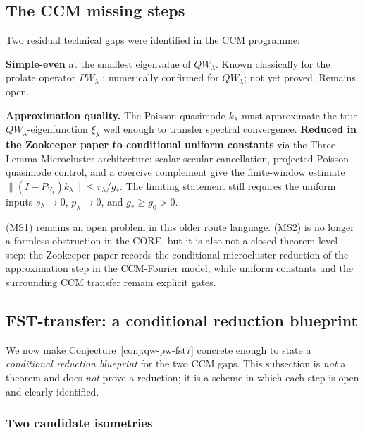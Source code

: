 \documentclass[11pt,a4paper]{article}
\theoremstyle{plain}
\theoremstyle{definition}
\begin{document}
\subsection{The CCM missing steps}
\label{sec:ccm-missing-steps}

Two residual technical gaps were identified in the CCM programme:
\begin{description}[leftmargin=*,style=nextline]
\item[(MS1)] \textbf{Simple-even} at the smallest eigenvalue of
  $QW_\lambda$.  Known classically for the prolate operator
  $PW_\lambda$ \cite{SlepianPollack1961}; numerically confirmed for
  $QW_\lambda$; not yet proved.  Remains open.
\item[(MS2)] \textbf{Approximation quality.} The Poisson quasimode
  $k_\lambda$ must approximate the true $QW_\lambda$-eigenfunction
  $\xi_\lambda$ well enough to transfer spectral convergence.
  \textbf{Reduced in the Zookeeper paper to conditional uniform
  constants} via the Three-Lemma Microcluster architecture: scalar
  secular cancellation, projected Poisson quasimode control, and a
  coercive complement give the finite-window estimate
  $\|(I-P_{V_\lambda})k_\lambda\| \leq r_\lambda/g_*$.  The limiting
  statement still requires the uniform inputs
  $s_\lambda\to0$, $p_\lambda\to0$, and $g_*\ge g_0>0$.
\end{description}

(MS1) remains an open problem in this older route language.  (MS2)
is no longer a formless obstruction in the CORE, but it is also not a
closed theorem-level step: the Zookeeper paper records the conditional
microcluster reduction of the approximation step in the CCM-Fourier
model, while uniform constants and the surrounding CCM transfer remain
explicit gates.

\subsection{FST-transfer: a conditional reduction blueprint}
\label{sec:fst-transfer}

We now make Conjecture~\ref{conj:qw-pw-fst7} concrete enough to
state a \emph{conditional reduction blueprint} for the two CCM gaps.
This subsection is \emph{not} a theorem and does \emph{not} prove a
reduction; it is a scheme in which each step is open and clearly
identified.

\subsubsection{Two candidate isometries}
\end{document}
